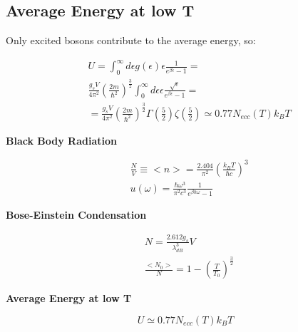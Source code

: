 \documentclass{article}
\begin{document}
\subsection{Average Energy at low T}

Only excited bosons contribute to the average energy, so:

\begin{equation}
    \begin{aligned}
         & U=\int_0^\infty d\epsilon g(\epsilon) \epsilon\frac{1}{e^{\beta\epsilon}-1}=                                                                           \\
         & \frac{g_sV}{4\pi^2}\left(\frac{2m}{\hbar^2}\right)^{\frac{3}{2}}\int_0^\infty d\epsilon \epsilon\frac{\sqrt{\epsilon}}{e^{\beta\epsilon}-1}=           \\
         & = \frac{g_sV}{4\pi^2}\left(\frac{2m}{\hbar^2}\right)^{\frac{3}{2}}\Gamma\left(\frac{5}{2}\right)\zeta\left(\frac{5}{2}\right)\simeq 0.77N_{ecc}(T)k_BT
    \end{aligned}
\end{equation}

\newpage

\newpage
\begin{tcolorbox}[colframe=gray!90, colback=gray!5, coltitle=white, sharp corners, title=\textbf{Bose Gas, Summary}, fonttitle=\large\bfseries]
    \textbf{Black Body Radiation}

    \begin{equation}
        \begin{aligned}
             & \frac{N}{V}\equiv<n>=\frac{2.404}{\pi^2}\left(\frac{k_B T}{\hbar c}\right)^3 \\
             & u(\omega)=\frac{\hbar \omega^3}{\pi^2c^3}\frac{1}{e^{\beta\hbar\omega}-1}
        \end{aligned}
    \end{equation}

    \textbf{Bose-Einstein Condensation}

    \begin{equation}
        \begin{aligned}
             & N=\frac{2.612 g_s}{\lambda_{dB}^3}V                        \\
             & \frac{<N_0>}{N}=1-\left(\frac{T}{T_0}\right)^{\frac{3}{2}}
        \end{aligned}
    \end{equation}

    \textbf{Average Energy at low T}

    \begin{equation}
        U\simeq 0.77N_{ecc}(T)k_BT
    \end{equation}

\end{tcolorbox}
\newpage
\end{document}
